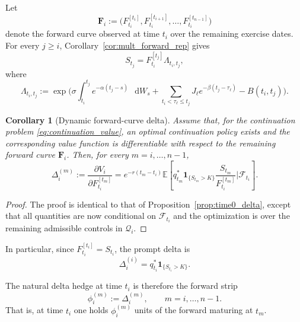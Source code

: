 \documentclass[10pt,a4paper,reqno]{amsart}
\newcommand{\<}{\langle}
\renewcommand{\>}{\rangle}
\newtheorem{corollary}[theorem]{Corollary}
\theoremstyle{example}
\newcommand*\D{\mathop{}\!\mathrm{d}}
\begin{document}
Let
\[
\mathbf{F}_i
:=
\big(
F_{t_i}^{[t_i]},F_{t_i}^{[t_{i+1}]},\dots,F_{t_i}^{[t_{n-1}]}
\big)
\]
denote the forward curve observed at time $t_i$ over the remaining exercise dates. For every $j\ge i$,
Corollary~\ref{cor:mult_forward_rep} gives
\begin{equation}
\label{eq:dynamic_forward_rep}
S_{t_j}
=
F_{t_i}^{[t_j]}\Lambda_{t_i,t_j},
\end{equation}
where
\begin{equation}
\label{eq:dynamic_lambda}
\Lambda_{t_i,t_j}
:=
\exp\!\Bigg(
\sigma \int_{t_i}^{t_j} e^{-\alpha(t_j-s)}\,\D W_s
+
\sum_{t_i<\tau_\ell\le t_j}
J_\ell e^{-\beta(t_j-\tau_\ell)}
-
B(t_i,t_j)
\Bigg).
\end{equation}

\begin{corollary}[Dynamic forward-curve delta]
\label{cor:dynamic_delta}
Assume that, for the continuation problem \eqref{eq:continuation_value}, an optimal continuation
policy exists and the corresponding value function is differentiable with respect to the remaining
forward curve $\mathbf{F}_i$. Then, for every $m=i,\dots,n-1$,
\begin{equation}
\label{eq:dynamic_delta_formula}
\Delta_i^{(m)}
:=
\frac{\partial V_i}{\partial F_{t_i}^{[t_m]}}
=
e^{-r(t_m-t_i)}
\mathbb{E}\!\left[
q_{t_m}^*
\mathbf{1}_{\{S_{t_m}>K\}}
\frac{S_{t_m}}{F_{t_i}^{[t_m]}}
\Bigg|
\mathcal{F}_{t_i}
\right].
\end{equation}
\end{corollary}

\begin{proof}
The proof is identical to that of Proposition~\ref{prop:time0_delta}, except that all quantities are now
conditional on $\mathcal{F}_{t_i}$ and the optimization is over the remaining admissible controls in
$\mathcal{Q}_i$.
\end{proof}

In particular, since $F_{t_i}^{[t_i]} = S_{t_i}$, the prompt delta is
\begin{equation}
\label{eq:prompt_delta}
\Delta_i^{(i)}
=
q_{t_i}^* \mathbf{1}_{\{S_{t_i}>K\}}.
\end{equation}

The natural delta hedge at time $t_i$ is therefore the forward strip
\begin{equation}
\label{eq:hedge_positions}
\phi_i^{(m)} := \Delta_i^{(m)},
\qquad
m=i,\dots,n-1.
\end{equation}
That is, at time $t_i$ one holds $\phi_i^{(m)}$ units of the forward maturing at $t_m$.
\end{document}
